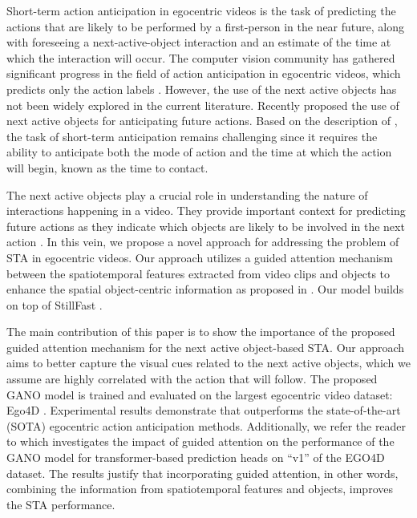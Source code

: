 \documentclass[10pt,twocolumn,letterpaper]{article}
\begin{document}
Short-term action anticipation in egocentric videos is the task of predicting the actions that are likely to be performed by a first-person in the near future, along with foreseeing a next-active-object interaction and an estimate of the time at which the interaction will occur. The computer vision community has gathered significant progress in the field of action anticipation in egocentric videos, which predicts only the action labels \cite{avt,liu2019forecasting,rulstm, memvit2022}. However, the use of the next active objects \cite{anacto,furnari2017next,ADL} has not been widely explored in the current literature. Recently \cite{ego4d} proposed the use of next active objects for anticipating future actions. Based on the description of \cite{ego4d}, the task of short-term anticipation remains challenging since it requires the ability to anticipate both the mode of action and the time at which the action will begin, known as the time to contact.

The next active objects play a crucial role in understanding the nature of interactions happening in a video. They provide important context for predicting future actions as they indicate which objects are likely to be involved in the next action \cite{tpami_contact}. In this vein, we propose a novel approach for addressing the problem of STA in egocentric videos. Our approach utilizes a guided attention mechanism between the spatiotemporal features extracted from video clips and objects to enhance the spatial object-centric information as proposed in \cite{gano}. Our model builds on top of StillFast \cite{ragusa2023stillfast}. 

The main contribution of this paper is to show the importance of the proposed guided attention mechanism for the next active object-based STA. Our approach aims to better capture the visual cues related to the next active objects, which we assume are highly correlated with the action that will follow.
The proposed GANO model is trained and evaluated on the largest egocentric video dataset: Ego4D \cite{ego4d}. Experimental results demonstrate that  outperforms the state-of-the-art (SOTA) egocentric action anticipation methods. Additionally, we refer the reader to \cite{gano} which investigates the impact of guided attention on the performance of the GANO model for transformer-based prediction heads on ``v1'' of the EGO4D dataset. The results justify that incorporating guided attention, in other words, combining the information from spatiotemporal features and objects, improves the STA performance.
\end{document}
